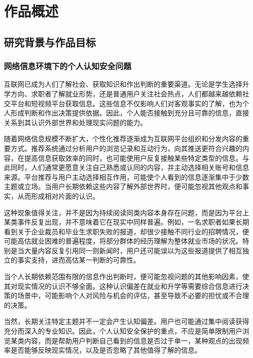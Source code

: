 \FloatBarrier\clearpage

\section{作品概述}\label{chapter:1}

\subsection{研究背景与作品目标}\label{section:1.1}

\subsubsection{网络信息环境下的个人认知安全问题}\label{section:1.1.1}

互联网已成为人们了解社会、获取知识和作出判断的重要渠道。无论是学生选择升学方向、求职者了解就业形势，还是普通用户关注社会热点，人们都越来越依赖社交平台和短视频平台获取信息。这些信息不仅影响人们对客观事实的了解，也为个人形成判断和作出决策提供依据。因此，个人能否接触到充分且可靠的信息，直接关系到其认识外部世界和处理现实问题的能力。

随着网络信息规模不断扩大，个性化推荐逐渐成为互联网平台组织和分发内容的重要方式。推荐系统通过分析用户的浏览记录和互动行为，向其推送更符合兴趣的内容，在提高信息获取效率的同时，也可能使用户反复接触某些特定类型的信息。与此同时，人们通常更愿意关注自己熟悉或认同的内容，并主动选择相关账号和信息来源。平台推荐与用户主动选择相互作用，可能使个人看到的信息逐渐集中于少数主题或立场。当用户长期依赖这些内容了解外部世界时，便可能忽视其他观点和事实，从而形成相对片面的认识。

这种现象值得关注，并不是因为持续阅读同类内容本身存在问题，而是因为平台上某类事件反复出现，并不意味着它在现实中同样普遍。例如，一名求职者如果长期看到关于企业裁员和毕业生求职失败的报道，却很少接触不同行业的招聘情况，便可能高估就业困难的普遍程度，将部分群体的经历理解为整体就业市场的状况。特别是当大量内容反复引用同一则新闻时，用户还可能误以为这些报道提供了相互独立的事实支持，进而高估某一判断的可靠性。

当个人长期依赖范围有限的信息作出判断时，便可能忽视问题的其他影响因素，使其对现实情况的认识不够全面。这种认识偏差在就业和升学等需要综合信息进行决策的场景中，可能影响个人对风险与机会的评估，甚至导致不必要的担忧或不合理的决策。

当然，长期关注特定主题并不一定会产生认知偏差。用户也可能通过集中阅读获得充分而深入的专业知识。因此，个人认知安全保护的重点，不应是简单限制用户浏览某类内容，而是帮助用户判断自己看到的信息是否过于单一，某种观点的出现频率是否能够反映现实情况，以及是否忽略了其他值得了解的信息。


